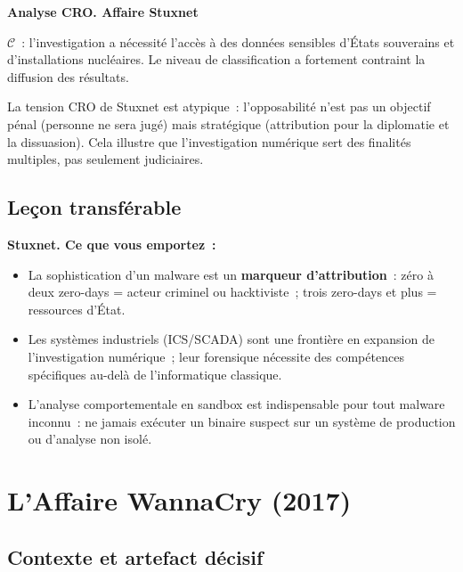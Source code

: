 \begin{boxCRO}
\textbf{Analyse CRO. Affaire Stuxnet}

$\mathcal{C}$~: l'investigation a nécessité l'accès à des données sensibles
d'États souverains et d'installations nucléaires. Le niveau de
classification a fortement contraint la diffusion des résultats.

La tension CRO de Stuxnet est atypique~: l'opposabilité n'est pas un
objectif pénal (personne ne sera jugé) mais stratégique (attribution
pour la diplomatie et la dissuasion). Cela illustre que l'investigation
numérique sert des finalités multiples, pas seulement judiciaires.
\end{boxCRO}

\subsection{Leçon transférable}

\begin{boxresume}
\textbf{Stuxnet. Ce que vous emportez~:}
\begin{itemize}
    \item La sophistication d'un malware est un \textbf{marqueur
          d'attribution}~: zéro à deux zero-days = acteur criminel ou
          hacktiviste~; trois zero-days et plus = ressources d'État.
    \item Les systèmes industriels (ICS/SCADA) sont une frontière en
          expansion de l'investigation numérique~; leur forensique
          nécessite des compétences spécifiques au-delà de l'informatique
          classique.
    \item L'analyse comportementale en sandbox est indispensable pour
          tout malware inconnu~: ne jamais exécuter un binaire suspect
          sur un système de production ou d'analyse non isolé.
\end{itemize}
\end{boxresume}

\section{L'Affaire WannaCry (2017)}
\label{sec:wannacry}

\subsection{Contexte et artefact décisif}


